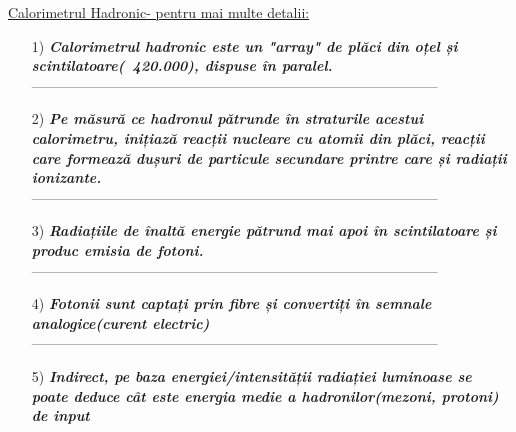 \documentclass{beamer}
\begin{document}
\begin{frame}{\href{https://atlas.cern/Discover/Detector/Calorimeter}{Calorimetrul Hadronic- pentru mai multe detalii:}}

\begin{enumerate}

 \small
    \item[1)] \makebox[0.5cm]{}  \textit{\textbf{Calorimetrul hadronic este un "array" de plăci din oțel și scintilatoare(~420.000), dispuse în paralel.}} \\

    ---------------------------------------------------------------------------------------
    
    \item[2)] \makebox[0.5cm]{}  \textit{\textbf{Pe măsură ce hadronul pătrunde în straturile acestui calorimetru, inițiază reacții nucleare cu atomii din plăci, reacții care formează dușuri de particule secundare printre care și radiații ionizante.}}\\

    ---------------------------------------------------------------------------------------

    \item[3)] \makebox[0.5cm]{}  \textit{\textbf{Radiațiile de înaltă energie pătrund mai apoi în scintilatoare și produc emisia de fotoni.}}\\

    ---------------------------------------------------------------------------------------

    \item[4)] \makebox[0.5cm]{}  \textit{\textbf{Fotonii sunt captați prin fibre și convertiți în semnale analogice(curent electric)}}\\

    ---------------------------------------------------------------------------------------

    \item[5)] \makebox[0.5cm]{}  \textit{\textbf{Indirect, pe baza energiei/intensității radiației luminoase se poate deduce cât este energia medie a hadronilor(mezoni, protoni) de input}}
    
\end{enumerate}
\end{frame}


\end{document}
